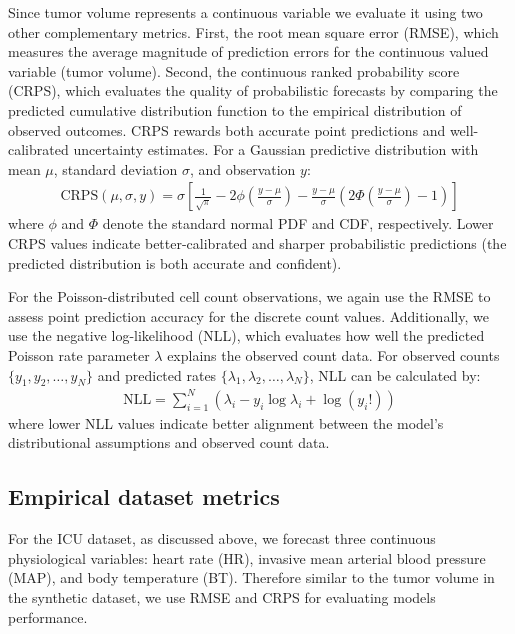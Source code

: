 \documentclass[preprint,12pt]{elsarticle}
\begin{document}
Since tumor volume represents a continuous variable we evaluate it using two other complementary metrics. First, the root mean square error (RMSE), which measures the average magnitude of prediction errors for the continuous valued variable (tumor volume). Second, the continuous ranked probability score (CRPS), which evaluates the quality of probabilistic forecasts by comparing the predicted cumulative distribution function to the empirical distribution of observed outcomes. CRPS rewards both accurate point predictions and well-calibrated uncertainty estimates. For a Gaussian predictive distribution with mean $\mu$, standard deviation $\sigma$, and observation $y$:
    \begin{align}
            \text{CRPS}(\mu, \sigma, y) = \sigma \left[ \frac{1}{\sqrt{\pi}} - 2\phi\left( \frac{y - \mu}{\sigma} \right) - \frac{y - \mu}{\sigma} \left( 2\Phi\left( \frac{y - \mu}{\sigma} \right) - 1 \right) \right]
    \end{align}
where $\phi$ and $\Phi$ denote the standard normal PDF and CDF, respectively. Lower CRPS values indicate better-calibrated and sharper probabilistic predictions (the predicted distribution is both accurate and confident).

For the Poisson-distributed cell count observations, we again use the RMSE to assess point prediction accuracy for the discrete count values. Additionally, we use the negative log-likelihood (NLL), which evaluates how well the predicted Poisson rate parameter $\lambda$ explains the observed count data. For observed counts $\{y_1, y_2, \ldots, y_N\}$ and predicted rates $\{\lambda_1, \lambda_2, \ldots, \lambda_N\}$, NLL can be calculated by:
\begin{align}
    \text{NLL} = \sum_{i=1}^{N} (\lambda_i - y_i \log \lambda_i + \log(y_i!))
\end{align}
where lower NLL values indicate better alignment between the model's distributional assumptions and observed count data.

\subsection{Empirical dataset metrics}
For the ICU dataset, as discussed above, we forecast three continuous physiological variables: heart rate (HR), invasive mean arterial blood pressure (MAP), and body temperature (BT). Therefore similar to the tumor volume in the synthetic dataset, we use RMSE and CRPS for evaluating models performance. 
\end{document}
